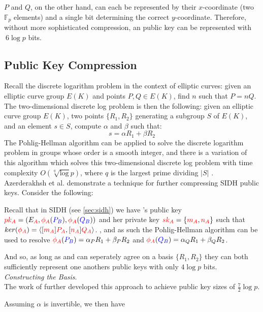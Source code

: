 $P$ and $Q$, on the other hand, can each be represented by their $x$-coordinate (two $\mathbb{F}_{p}$ elements) and a single bit determining the correct $y$-coordinate. Therefore, without more sophisticated compression, an \sidh public key can be represented with $~6\log p$ bits.

\subsection{Public Key Compression}

Recall the discrete logarithm problem in the context of elliptic curves: given an elliptic curve group $E(K)$ and points $P, Q \in E(K)$, find $n$ such that $P = nQ$. The two-dimensional discrete log problem is then the following: given an elliptic curve group $E(K)$, two points $\{R_1, R_2\}$ generating a subgroup $S$ of $E(K)$, and an element $s \in S$, compute $\alpha$ and $\beta$ such that:
$$
s = \alpha R_1 + \beta R_2
$$
The Pohlig-Hellman algorithm can be applied to solve the discrete logarithm problem in groups whose order is a smooth integer, and there is a variation of this algorithm which solves this two-dimensional discrete log problem with time complexity $O(\sqrt[q]\log p)$, where $q$ is the largest prime dividing $\vert S\vert$ \cite{compwr}.\\

\noindent
Azerderakhsh et al. demonstrate a technique for further compressing SIDH public keys. Consider the following:

Recall that in SIDH (see \ref{sec:sidh}) we have \alice's public key $\textcolor{red}{pk_A} = (E_{\textcolor{red}{A}}, \textcolor{red}{\phi_A}(\textcolor{blue}{P_B}),\textcolor{red}{\phi_A}(\textcolor{blue}{Q_B}))$ and her private key $\textcolor{red}{sk_A} = \{\textcolor{red}{m_A}, \textcolor{red}{n_A}\}$ such that $ker(\textcolor{red}{\phi_A}) = \langle [\textcolor{red}{m_A}]\textcolor{red}{P_A}, [\textcolor{red}{n_A}]\textcolor{red}{Q_A}\rangle$. , and as such the Pohlig-Hellman algorithm can be used to resolve $\textcolor{red}{\phi_A}(\textcolor{blue}{P_B}) = \alpha_P R_1 + \beta_P R_2$ and $\textcolor{red}{\phi_A}(\textcolor{blue}{Q_B}) = \alpha_Q R_1 + \beta_Q R_2$.

And so, as long as \alice and \bob can seperately agree on a basis $\{R_1, R_2\}$ they can both sufficiently represent one anothers public keys with only $4\log p$ bits.\\

\noindent
\textit{Constructing the Basis}.\\



The work of \cite{pkcomp} further developed this approach to achieve public key sizes of $\frac{7}{2}\log p$. 

Assuming $\alpha$ is invertible, we then have

